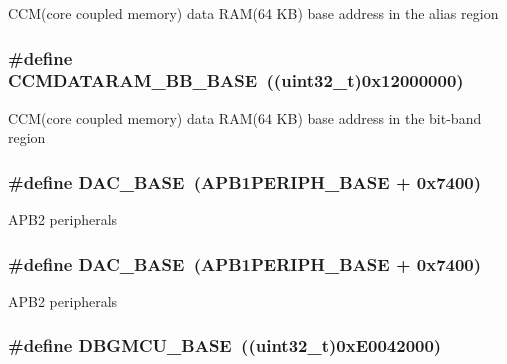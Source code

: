 C\-C\-M(core coupled memory) data R\-A\-M(64 K\-B) base address in the alias region \hypertarget{group___peripheral__memory__map_gaf98d1f99ecd952ee59e80b345d835bb0}{
\subsubsection[{C\-C\-M\-D\-A\-T\-A\-R\-A\-M\-\_\-\-B\-B\-\_\-\-B\-A\-S\-E}]{\setlength{\rightskip}{0pt plus 5cm}\#define C\-C\-M\-D\-A\-T\-A\-R\-A\-M\-\_\-\-B\-B\-\_\-\-B\-A\-S\-E~((uint32\-\_\-t)0x12000000)}}\label{group___peripheral__memory__map_gaf98d1f99ecd952ee59e80b345d835bb0}
C\-C\-M(core coupled memory) data R\-A\-M(64 K\-B) base address in the bit-\/band region \hypertarget{group___peripheral__memory__map_gad18d0b914c7f68cecbee1a2d23a67d38}{
\subsubsection[{D\-A\-C\-\_\-\-B\-A\-S\-E}]{\setlength{\rightskip}{0pt plus 5cm}\#define D\-A\-C\-\_\-\-B\-A\-S\-E~(A\-P\-B1\-P\-E\-R\-I\-P\-H\-\_\-\-B\-A\-S\-E + 0x7400)}}\label{group___peripheral__memory__map_gad18d0b914c7f68cecbee1a2d23a67d38}
A\-P\-B2 peripherals \hypertarget{group___peripheral__memory__map_gad18d0b914c7f68cecbee1a2d23a67d38}{
\subsubsection[{D\-A\-C\-\_\-\-B\-A\-S\-E}]{\setlength{\rightskip}{0pt plus 5cm}\#define D\-A\-C\-\_\-\-B\-A\-S\-E~(A\-P\-B1\-P\-E\-R\-I\-P\-H\-\_\-\-B\-A\-S\-E + 0x7400)}}\label{group___peripheral__memory__map_gad18d0b914c7f68cecbee1a2d23a67d38}
A\-P\-B2 peripherals \hypertarget{group___peripheral__memory__map_ga4adaf4fd82ccc3a538f1f27a70cdbbef}{
\subsubsection[{D\-B\-G\-M\-C\-U\-\_\-\-B\-A\-S\-E}]{\setlength{\rightskip}{0pt plus 5cm}\#define D\-B\-G\-M\-C\-U\-\_\-\-B\-A\-S\-E~((uint32\-\_\-t)0x\-E0042000)}}\label{group___peripheral__memory__map_ga4adaf4fd82ccc3a538f1f27a70cdbbef}
